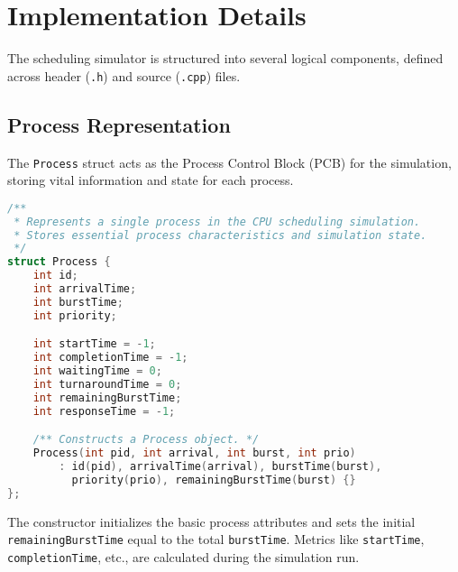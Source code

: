\documentclass[12pt]{article}
\begin{document}
\section{Implementation Details}
The scheduling simulator is structured into several logical components, defined across header (\texttt{.h}) and source (\texttt{.cpp}) files.

\subsection{Process Representation }
The \texttt{Process} struct acts as the Process Control Block (PCB) for the simulation, storing vital information and state for each process.
\begin{lstlisting}[language=C++, caption={Process Struct Definition (Process.h)}, label={lst:process_struct}, style=cppstyle]
/**
 * Represents a single process in the CPU scheduling simulation.
 * Stores essential process characteristics and simulation state.
 */
struct Process {
    int id;
    int arrivalTime;
    int burstTime;
    int priority;

    int startTime = -1;
    int completionTime = -1;
    int waitingTime = 0;
    int turnaroundTime = 0;
    int remainingBurstTime;
    int responseTime = -1;

    /** Constructs a Process object. */
    Process(int pid, int arrival, int burst, int prio)
        : id(pid), arrivalTime(arrival), burstTime(burst), 
          priority(prio), remainingBurstTime(burst) {}
};
\end{lstlisting}
The constructor initializes the basic process attributes and sets the initial \texttt{remainingBurstTime} equal to the total \texttt{burstTime}. Metrics like \texttt{startTime}, \texttt{completionTime}, etc., are calculated during the simulation run.
\end{document}

